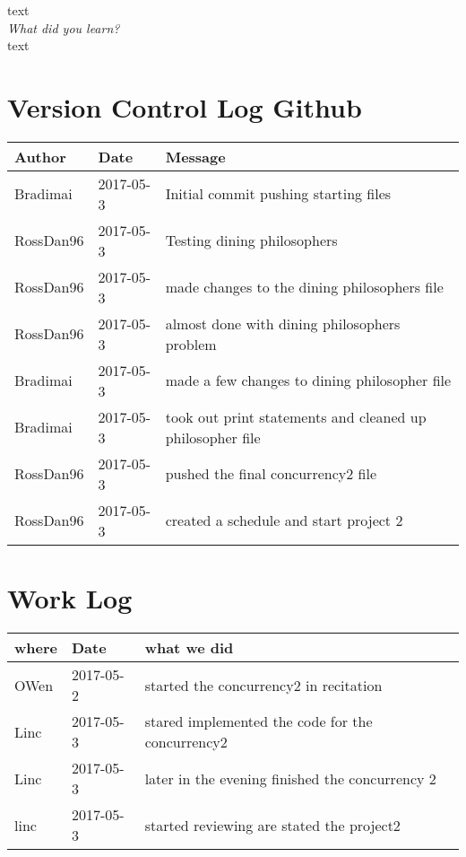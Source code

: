 \documentclass[letterpaper,10pt,titlepage]{article}
\begin{document}
text\\

\textit{What did you learn?}\\

text\\

\section{Version Control Log Github}
\begin{tabular}{lll} \textbf{Author}
     & \textbf{Date}
     & \textbf{Message}
\\ \hline
Bradimai & 2017-05-3 & Initial commit pushing starting files \\ \hline
RossDan96 & 2017-05-3 & Testing dining philosophers \\ \hline
RossDan96 & 2017-05-3 & made changes to the dining philosophers file \\ \hline
RossDan96 & 2017-05-3 & almost done with dining philosophers problem \\ \hline
Bradimai & 2017-05-3 & made a few changes to dining philosopher file\\ \hline
Bradimai & 2017-05-3 & took out print statements and cleaned up philosopher file \\ \hline
RossDan96 & 2017-05-3 &  pushed the final concurrency2 file\\ \hline
RossDan96 & 2017-05-3 & created a schedule and start project 2 \\ \hline

\end{tabular}

\section{Work Log}

\begin{tabular}{lll} \textbf{where}
     & \textbf{Date}
     & \textbf{what we did}

\\ \hline
OWen & 2017-05-2 & started the concurrency2 in recitation  \\ \hline
Linc & 2017-05-3 & stared implemented the code for the concurrency2 \\ \hline
Linc & 2017-05-3 &  later in the evening finished the concurrency 2\\ \hline
linc & 2017-05-3 & started reviewing are stated the project2 \\ \hline

\end{tabular}
\end{document}
